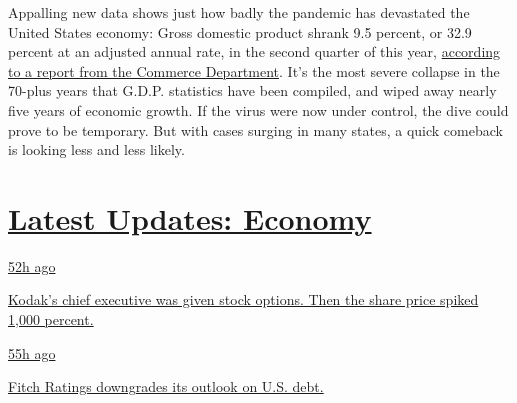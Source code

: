Appalling new data shows just how badly the pandemic has devastated the
United States economy: Gross domestic product shrank 9.5 percent, or
32.9 percent at an adjusted annual rate, in the second quarter of this
year,
\href{https://www.nytimes3xbfgragh.onion/2020/07/30/business/economy/q2-gdp-coronavirus-economy.html}{according
to a report from the Commerce Department}. It's the most severe collapse
in the 70-plus years that G.D.P. statistics have been compiled, and
wiped away nearly five years of economic growth. If the virus were now
under control, the dive could prove to be temporary. But with cases
surging in many states, a quick comeback is looking less and less
likely.

\hypertarget{latest-updates-economy}{%
\section{\texorpdfstring{\href{https://www.nytimes3xbfgragh.onion/live/2020/07/31/business/stock-market-today-coronavirus?action=click\&pgtype=Article\&state=default\&region=MAIN_CONTENT_1\&context=storylines_live_updates}{Latest
Updates:
Economy}}{Latest Updates: Economy}}\label{latest-updates-economy}}

\href{https://www.nytimes3xbfgragh.onion/live/2020/07/31/business/stock-market-today-coronavirus?action=click\&pgtype=Article\&state=default\&region=MAIN_CONTENT_1\&context=storylines_live_updates\#kodaks-chief-executive-was-given-stock-options-then-the-share-price-spiked-1000-percent}{52h
ago}

\href{https://www.nytimes3xbfgragh.onion/live/2020/07/31/business/stock-market-today-coronavirus?action=click\&pgtype=Article\&state=default\&region=MAIN_CONTENT_1\&context=storylines_live_updates\#kodaks-chief-executive-was-given-stock-options-then-the-share-price-spiked-1000-percent}{Kodak's
chief executive was given stock options. Then the share price spiked
1,000 percent.}

\href{https://www.nytimes3xbfgragh.onion/live/2020/07/31/business/stock-market-today-coronavirus?action=click\&pgtype=Article\&state=default\&region=MAIN_CONTENT_1\&context=storylines_live_updates\#fitch-ratings-downgrades-its-outlook-on-us-debt}{55h
ago}

\href{https://www.nytimes3xbfgragh.onion/live/2020/07/31/business/stock-market-today-coronavirus?action=click\&pgtype=Article\&state=default\&region=MAIN_CONTENT_1\&context=storylines_live_updates\#fitch-ratings-downgrades-its-outlook-on-us-debt}{Fitch
Ratings downgrades its outlook on U.S. debt.}

